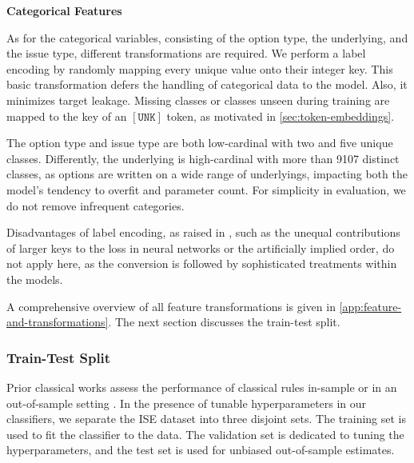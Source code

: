 \textbf{Categorical Features}

As for the categorical variables, consisting of the option type, the underlying, and the issue type, different transformations are required. We perform a label encoding by randomly mapping every unique value onto their integer key. This basic transformation defers the handling of categorical data to the model. Also, it minimizes target leakage. Missing classes or classes unseen during training are mapped to the key of an $\mathtt{[UNK]}$ \gls{token}, as motivated in \cref{sec:token-embeddings}.

The option type and issue type are both low-cardinal with two and five unique classes. Differently, the underlying is high-cardinal with more than \num{9107} distinct classes, as options are written on a wide range of underlyings, impacting both the model's tendency to overfit and parameter count. For simplicity in evaluation, we do not remove infrequent categories.

Disadvantages of label encoding, as raised in \textcite[\checkmark][12]{hancockSurveyCategoricalData2020}, such as the unequal contributions of larger keys to the loss in neural networks or the artificially implied order, do not apply here, as the conversion is followed by sophisticated treatments within the models.

A comprehensive overview of all feature transformations is given in \cref{app:feature-and-transformations}. The next section discusses the train-test split.

\subsubsection{Train-Test Split}\label{sec:train-test-split}

Prior classical works assess the performance of classical rules in-sample \autocite[cp.][541]{ellisAccuracyTradeClassification2000} or in an out-of-sample setting \autocites[cp.][9]{grauerOptionTradeClassification2022}[\checkmark][3814--3815]{chakrabartyTradeClassificationAlgorithms2007}. In the presence of tunable hyperparameters in our classifiers, we separate the \gls{ISE} dataset into three disjoint sets. The training set is used to fit the classifier to the data. The validation set is dedicated to tuning the hyperparameters, and the test set is used for unbiased out-of-sample estimates.


